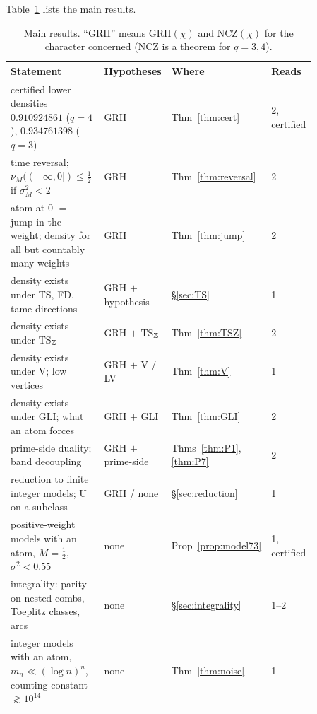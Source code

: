 Table~\ref{tab:summary} lists the main results.

\begin{table}[ht]\small
\caption{Main results. ``GRH'' means GRH$(\chi)$ and NCZ$(\chi)$ for the character concerned (NCZ is a theorem for $q=3,4$).}\label{tab:summary}
\begin{tabular}{p{0.37\linewidth}p{0.2\linewidth}p{0.12\linewidth}p{0.17\linewidth}}\toprule
Statement&Hypotheses&Where&Reads\\\midrule
certified lower densities $0.910924861$ ($q=4$), $0.934761398$ ($q=3$)&GRH&Thm~\ref{thm:cert}&2, certified\\
time reversal; $\nu_M((-\infty,0])\le\frac12$ if $\sigma_M^2<2$&GRH&Thm~\ref{thm:reversal}&2\\
atom at $0$ $=$ jump in the weight; density for all but countably many weights&GRH&Thm~\ref{thm:jump}&2\\
density exists under TS, FD, tame directions&GRH $+$ hypothesis&\S\ref{sec:TS}&1\\
density exists under TS$_\mathbb Z$&GRH $+$ TS$_\mathbb Z$&Thm~\ref{thm:TSZ}&2\\
density exists under V; low vertices&GRH $+$ V / LV&Thm~\ref{thm:V}&1\\
density exists under GLI; what an atom forces&GRH $+$ GLI&Thm~\ref{thm:GLI}&2\\
prime-side duality; band decoupling&GRH $+$ prime-side&Thms~\ref{thm:P1}, \ref{thm:P7}&2\\
reduction to finite integer models; U on a subclass&GRH / none&\S\ref{sec:reduction}&1\\
positive-weight models with an atom, $M=\frac12$, $\sigma^2<0.55$&none&Prop~\ref{prop:model73}&1, certified\\
integrality: parity on nested combs, Toeplitz classes, arcs&none&\S\ref{sec:integrality}&1--2\\
integer models with an atom, $m_n\ll(\log n)^u$, counting constant $\gtrsim10^{14}$&none&Thm~\ref{thm:noise}&1\\\bottomrule
\end{tabular}
\end{table}
